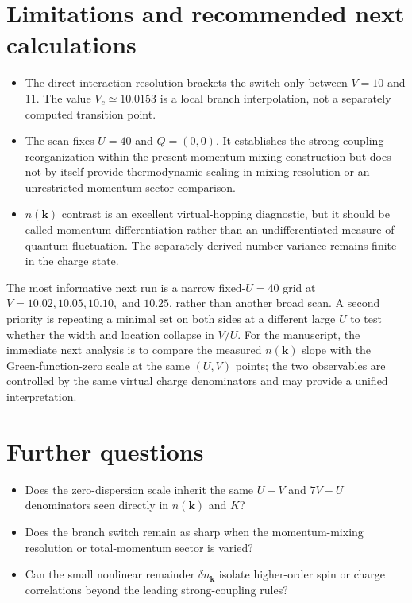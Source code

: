 \documentclass[10pt]{article}
\newcommand{\vk}{\mathbf{k}}
\begin{document}
\section{Limitations and recommended next calculations}

\begin{itemize}
\item The direct interaction resolution brackets the switch only between $V=10$ and
11.  The value $V_c\simeq 10.0153$ is a local branch interpolation, not a separately
computed transition point.
\item The scan fixes $U=40$ and $Q=(0,0)$.  It establishes the strong-coupling
reorganization within the present momentum-mixing construction but does not by
itself provide thermodynamic scaling in mixing resolution or an unrestricted
momentum-sector comparison.
\item $n(\vk)$ contrast is an excellent virtual-hopping diagnostic, but it should be
called momentum differentiation rather than an undifferentiated measure of quantum
fluctuation.  The separately derived number variance remains finite in the charge
state.
\end{itemize}

The most informative next run is a narrow fixed-$U=40$ grid at
$V=10.02,10.05,10.10,$ and $10.25$, rather than another broad scan.  A second priority
is repeating a minimal set on both sides at a different large $U$ to test whether the
width and location collapse in $V/U$.  For the manuscript, the immediate next analysis
is to compare the measured $n(\vk)$ slope with the Green-function-zero scale at the
same $(U,V)$ points; the two observables are controlled by the same virtual charge
denominators and may provide a unified interpretation.

\section*{Further questions}
\begin{itemize}
\item Does the zero-dispersion scale inherit the same $U-V$ and $7V-U$ denominators
seen directly in $n(\vk)$ and $K$?
\item Does the branch switch remain as sharp when the momentum-mixing resolution or
total-momentum sector is varied?
\item Can the small nonlinear remainder $\delta n_{\vk}$ isolate higher-order spin
or charge correlations beyond the leading strong-coupling rules?
\end{itemize}
\end{document}
